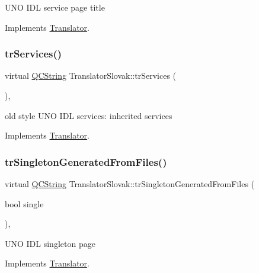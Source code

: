 U\+NO I\+DL service page title 

Implements \mbox{\hyperlink{class_translator}{Translator}}.

\mbox{\label{class_translator_slovak_a80651df2c215554755886c5f7cb75df8}} 
\subsubsection{\texorpdfstring{trServices()}{trServices()}}
{\footnotesize\ttfamily virtual \mbox{\hyperlink{class_q_c_string}{Q\+C\+String}} Translator\+Slovak\+::tr\+Services (\begin{DoxyParamCaption}{ }\end{DoxyParamCaption})\hspace{0.3cm}{\ttfamily [inline]}, {\ttfamily [virtual]}}

old style U\+NO I\+DL services\+: inherited services 

Implements \mbox{\hyperlink{class_translator}{Translator}}.

\mbox{\label{class_translator_slovak_a35ca111053cc9b953ca969356dec81af}} 
\subsubsection{\texorpdfstring{trSingletonGeneratedFromFiles()}{trSingletonGeneratedFromFiles()}}
{\footnotesize\ttfamily virtual \mbox{\hyperlink{class_q_c_string}{Q\+C\+String}} Translator\+Slovak\+::tr\+Singleton\+Generated\+From\+Files (\begin{DoxyParamCaption}\item[{bool}]{single }\end{DoxyParamCaption})\hspace{0.3cm}{\ttfamily [inline]}, {\ttfamily [virtual]}}

U\+NO I\+DL singleton page 

Implements \mbox{\hyperlink{class_translator}{Translator}}.

\mbox{\label{class_translator_slovak_aec962f85adc32f538f933f0a9411de09}} 
